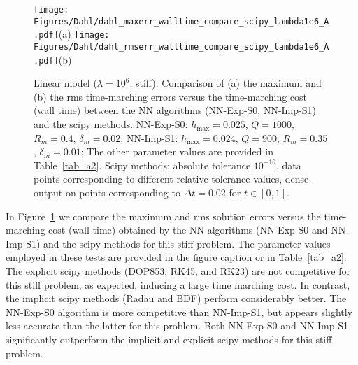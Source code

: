 \begin{figure}
  \centerline{
    \texttt{[image: Figures/Dahl/dahl\_maxerr\_walltime\_compare\_scipy\_lambda1e6\_A.pdf]}(a)
    \texttt{[image: Figures/Dahl/dahl\_rmserr\_walltime\_compare\_scipy\_lambda1e6\_A.pdf]}(b)
  }
  \caption{Linear model ($\lambda=10^6$, stiff):
    Comparison of (a) the maximum and (b) the rms time-marching errors
    versus the time-marching cost (wall time) 
    between the NN algorithms (NN-Exp-S0, NN-Imp-S1)
    and the  scipy methods.
    NN-Exp-S0: $h_{\max}=0.025$, $Q=1000$, $R_m=0.4$, $\delta_m=0.02$;
    NN-Imp-S1: $h_{\max}=0.024$, $Q=900$, $R_m=0.35$, $\delta_m=0.01$;
    The other parameter values are provided in Table~\ref{tab_a2}.
    Scipy methods: absolute tolerance $10^{-16}$, 
    data points corresponding to different relative tolerance values,
    dense output on points corresponding to $\Delta t=0.02$ for $t\in[0,1]$.
  }
  \label{fg_8}
\end{figure}

In Figure~\ref{fg_8} we compare the maximum and rms solution errors
versus the time-marching cost (wall time) obtained
by the NN algorithms (NN-Exp-S0 and NN-Imp-S1)
and the scipy methods for this stiff problem. 
The parameter values employed in
these tests are provided in the figure caption or in Table~\ref{tab_a2}.
The explicit scipy methods (DOP853, RK45, and RK23)
are not competitive for this stiff problem,
as expected, inducing a large time marching cost.
In contrast, the implicit scipy methods (Radau and BDF) perform considerably better.
The NN-Exp-S0 algorithm is more competitive than NN-Imp-S1, but
appears slightly less accurate than the latter for this problem.
Both NN-Exp-S0 and NN-Imp-S1 significantly outperform
the implicit and explicit scipy methods for this stiff problem.


